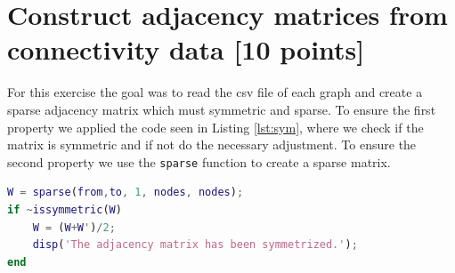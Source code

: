 \section{Construct adjacency matrices from connectivity data [10 points]}
For this exercise the goal was to read the csv file of each graph and create a sparse adjacency matrix which must symmetric and sparse.
To ensure the first property  we applied the code seen in Listing \ref{lst:sym}, where we check if the matrix is symmetric and if not do the necessary adjustment.
To ensure the second property we use the \texttt{sparse} function to create a sparse matrix.
\begin{lstlisting}[language=Matlab, caption=Ensure symmetric property, label=lst:sym]
W = sparse(from,to, 1, nodes, nodes);
if ~issymmetric(W)
	W = (W+W')/2;
	disp('The adjacency matrix has been symmetrized.');
end
\end{lstlisting}

